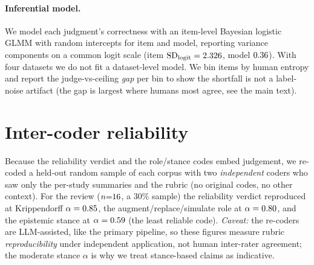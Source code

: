 \paragraph{Inferential model.} We model each judgment's correctness with an item-level Bayesian logistic GLMM with
random intercepts for item and model, reporting variance components on a common logit scale (item
$\mathrm{SD}_{\text{logit}}=2.326$, model $0.36$). With four datasets we do not fit a
dataset-level model. We bin items by human entropy and report the judge-vs-ceiling \emph{gap} per bin to show the
shortfall is not a label-noise artifact (the gap is largest where humans most agree, see the main text).

\section{Inter-coder reliability}\label{app:irr}
Because the reliability verdict and the role/stance codes embed judgement, we re-coded a held-out random sample of
each corpus with two \emph{independent} coders who saw only the per-study summaries and the rubric (no original
codes, no other context). For the review ($n{=}16$, a 30\% sample) the reliability verdict reproduced at
Krippendorff $\alpha=0.85$, the augment/replace/simulate role at $\alpha=0.80$, and the epistemic stance
at $\alpha=0.59$ (the least reliable code). \emph{Caveat:} the re-coders are
LLM-assisted, like the primary pipeline, so these figures measure rubric \emph{reproducibility} under independent
application, not human inter-rater agreement; the moderate stance $\alpha$ is why we treat stance-based claims as
indicative.

